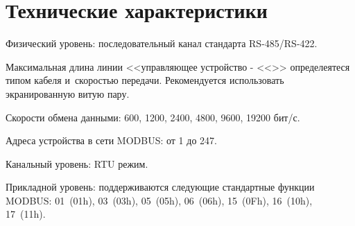 \section{Технические характеристики} \label{sec:tth}

\begin{list}{--}{}
\item Физический уровень: последовательный канал стандарта RS-485/RS-422.
\item Максимальная длина линии <<управляющее устройство - <<\deviceCurrent{}>> определеятеся типом кабеля и~скоростью передачи. Рекомендуется использовать экранированную витую пару.
\item Скорости обмена данными: 600, 1200, 2400, 4800, 9600, 19200 бит/с.
\item Адреса устройства в сети MODBUS: от 1 до 247.
\item Канальный уровень: RTU режим.
\item Прикладной уровень: поддерживаются следующие стандартные функции MODBUS: 01~(01h), 03~(03h), 05~(05h), 06~(06h), 15~(0Fh), 16~(10h), 17~(11h).
\end{list}